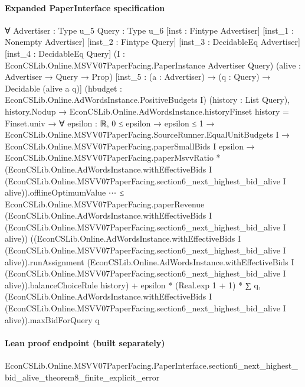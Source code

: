 \documentclass[10pt]{article}
\begin{document}
\paragraph{Expanded PaperInterface specification}
\begin{ReviewVerbatim}
∀ {Advertiser : Type u_5} {Query : Type u_6} [inst : Fintype Advertiser] [inst_1 : Nonempty Advertiser]
  [inst_2 : Fintype Query] [inst_3 : DecidableEq Advertiser] [inst_4 : DecidableEq Query]
  (I : EconCSLib.Online.MSVV07PaperFacing.PaperInstance Advertiser Query) (alive : Advertiser → Query → Prop)
  [inst_5 : (a : Advertiser) → (q : Query) → Decidable (alive a q)]
  (hbudget : EconCSLib.Online.AdWordsInstance.PositiveBudgets I) (history : List Query),
  history.Nodup →
    EconCSLib.Online.AdWordsInstance.historyFinset history = Finset.univ →
      ∀ {epsilon : ℝ},
        0 ≤ epsilon →
          epsilon ≤ 1 →
            EconCSLib.Online.MSVV07PaperFacing.SourceRunner.EqualUnitBudgets I →
              EconCSLib.Online.MSVV07PaperFacing.paperSmallBids I epsilon →
                EconCSLib.Online.MSVV07PaperFacing.paperMsvvRatio *
                    (EconCSLib.Online.AdWordsInstance.withEffectiveBids I
                          (EconCSLib.Online.MSVV07PaperFacing.section6_next_highest_bid_alive I
                            alive)).offlineOptimumValue
                      ⋯ ≤
                  EconCSLib.Online.MSVV07PaperFacing.paperRevenue
                      (EconCSLib.Online.AdWordsInstance.withEffectiveBids I
                        (EconCSLib.Online.MSVV07PaperFacing.section6_next_highest_bid_alive I alive))
                      ((EconCSLib.Online.AdWordsInstance.withEffectiveBids I
                            (EconCSLib.Online.MSVV07PaperFacing.section6_next_highest_bid_alive I alive)).runAssignment
                        (EconCSLib.Online.AdWordsInstance.withEffectiveBids I
                            (EconCSLib.Online.MSVV07PaperFacing.section6_next_highest_bid_alive I
                              alive)).balanceChoiceRule
                        history) +
                    epsilon * (Real.exp 1 + 1) *
                      ∑ q,
                        (EconCSLib.Online.AdWordsInstance.withEffectiveBids I
                              (EconCSLib.Online.MSVV07PaperFacing.section6_next_highest_bid_alive I
                                alive)).maxBidForQuery
                          q
\end{ReviewVerbatim}

\paragraph{Lean proof endpoint (built separately)}\begin{ReviewVerbatim}
EconCSLib.Online.MSVV07PaperFacing.PaperInterface.section6_next_highest_bid_alive_theorem8_finite_explicit_error
\end{ReviewVerbatim}
\end{document}
